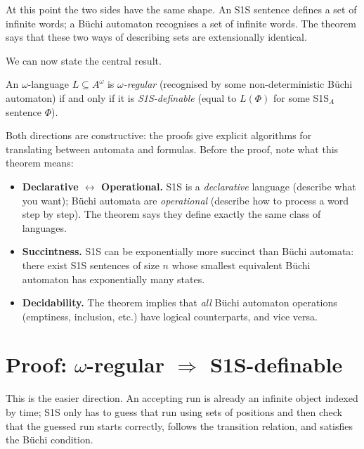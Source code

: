 At this point the two sides have the same shape.  An S1S sentence defines a
set of infinite words; a Büchi automaton recognises a set of infinite words.
The theorem says that these two ways of describing sets are extensionally
identical.

We can now state the central result.

\begin{theorem}[Büchi, 1960]
\label{thm:buchi}
An $\omega$-language $L \subseteq A^\omega$ is \emph{$\omega$-regular}
(recognised by some non-deterministic Büchi automaton) if and only if it
is \emph{S1S-definable} (equal to $L(\Phi)$ for some S1S$_A$ sentence
$\Phi$).
\end{theorem}

Both directions are constructive: the proofs give explicit algorithms for
translating between automata and formulas.  Before the proof, note what
this theorem means:

\begin{itemize}
  \item \textbf{Declarative $\leftrightarrow$ Operational.}  S1S is a
        \emph{declarative} language (describe what you want); Büchi automata
        are \emph{operational} (describe how to process a word step by step).
        The theorem says they define exactly the same class of languages.
  \item \textbf{Succintness.}  S1S can be exponentially more succinct
        than Büchi automata: there exist S1S sentences of size $n$ whose
        smallest equivalent Büchi automaton has exponentially many states.
  \item \textbf{Decidability.}  The theorem implies that \emph{all} Büchi
        automaton operations (emptiness, inclusion, etc.) have logical
        counterparts, and vice versa.
\end{itemize}

\section{Proof: \texorpdfstring{$\omega$-regular $\Rightarrow$ S1S-definable}{omega-regular implies S1S-definable}}
\label{sec:buchi-proof-fwd}

This is the easier direction.  An accepting run is already an infinite
object indexed by time; S1S only has to guess that run using sets of
positions and then check that the guessed run starts correctly, follows the
transition relation, and satisfies the Büchi condition.


